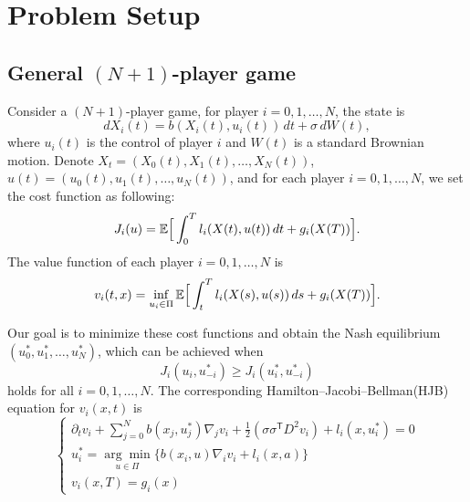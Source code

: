 \documentclass{article}
\begin{document}
 
\section{Problem Setup}

\subsection{General $(N+1)$-player game}

Consider a $(N+1)$-player game, for player $i = 0, 1, \dots, N$, the state is
\begin{equation} \label{state of N+1 player game}
    d X_{i}(t) = b(X_{i}(t), u_{i}(t)) \, d t + \sigma \, d W(t),
\end{equation}
where $u_{i} (t)$ is the control of player $i$ and $W(t)$ is a standard Brownian motion. Denote $X_{t} = (X_{0}(t), X_{1}(t), \dots, X_{N}(t))$,  $u(t) = (u_{0}(t), u_{1}(t), \dots, u_{N}(t))$, and for each player $i = 0, 1, \dots, N$, we set the cost function as following:
\begin{equation} \label{cost function of of N+1 player game}
    J_{i}(u) = \mathbb{E} \Big{[} \int_{0}^{T} l_{i}(X(t), u(t)) \, d t + g_{i}(X(T)) \Big{]}.
\end{equation}
The value function of each player $i = 0, 1, \dots, N$ is
\begin{equation*} \label{value function of N+1 player game}
    v_{i} (t,x) = \inf_{u_{i} \in \Pi} \mathbb{E} \Big{[} \int_{t}^{T} l_{i}(X(s), u(s)) \, d s + g_{i}(X(T)) \Big{]}.
\end{equation*}

Our goal is to minimize these cost functions and obtain the Nash equilibrium $(u_{0}^{*}, u_{1}^{*}, \dots, u_{N}^{*})$, which can be achieved when 
\begin{equation} \label{eq: Nash equilibrium of N+1 player game}
    J_{i}(u_{i}, u_{-i}^{*}) \geq J_{i}(u_{i}^{*}, u_{-i}^{*})
\end{equation}
holds for all $i = 0, 1, \dots, N$. The corresponding Hamilton–Jacobi–Bellman(HJB) equation for $v_{i}(x, t)$ is
\begin{equation} \label{HJB of N+1 player game}
    \begin{cases}
    \partial_{t} v_{i} + \sum_{j = 0}^{N} b(x_{j}, u_{j}^{*}) \nabla_{j} v_{i} + \frac{1}{2} (\sigma \sigma^\mathsf{T} D^{2} v_{i}) + l_{i}(x, u_{i}^{*}) = 0 \\
    u_{i}^{*} = \underset{u \in \Pi}{\arg\min} \{b(x_{i}, u) \nabla_{i} v_{i} + l_{i}(x, a) \} \\
    v_{i} (x, T) = g_{i} (x)
    \end{cases}
\end{equation}
\end{document}
